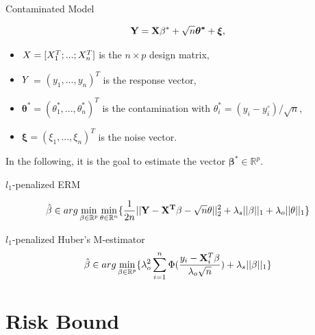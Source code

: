 \documentclass[unknownkeysallowed]{beamer}
\begin{document}
\begin{frame}{Contaminated Model}
	
	\begin{equation*}
	\bold{Y} = \bold{X\beta^*} + \sqrt{n} \boldsymbol{\theta^*} + \boldsymbol{\xi},
	\end{equation*}
	
	\begin{itemize}
		\item $\boldmath{X} = [\boldmath{X}_1^T;...;\boldmath{X}^T_n]$ is the $n\times p$ design matrix,
		\item $\boldmath{Y}$ = $(y_1,...,y_n)^T$ is the response vector,
		\item $ \boldsymbol{\theta^*} = (\theta^*_1,...,\theta^*_n)^T$ is the contamination with $\theta^*_i = (y_i - y_i^{\circ})/\sqrt{n}$,
		\item $\boldsymbol{\xi} = (\xi_1,...,\xi_n)^T$ is the noise vector.
	\end{itemize}
	In the following, it is the goal to estimate the vector $\boldsymbol{\beta}^* \in \mathbb{R}^p$.
\end{frame}



\begin{frame}{$l_1$-penalized ERM}
	
	\begin{equation*}
	\hat{\bold{\beta}} \in arg
	\min\limits_{\bold{\beta}\in
		\mathbb{R}^p} \min\limits_{\bold{\theta}\in
		\mathbb{R}^n}\{\frac{1}{2n} ||\bold{Y} - \bold{X^T\beta} - \sqrt{n}\bold{\theta}||_2^2 + \lambda_s ||\bold{\beta}||_1 + \lambda_o||\bold{\theta}||_1\}
	\end{equation*}
	
\end{frame}


\begin{frame}{$l_1$-penalized Huber's M-estimator}
	\begin{equation*}
	\hat{\beta} \in arg \min\limits_{\bold{\beta}\in
		\mathbb{R}^p} \{ \lambda_o^2 \sum_{i = 1}^{n}\Phi (\frac{y_i - \bold{X}^T_i \bold{\beta}}{\lambda_o \sqrt{n}}) + \lambda_s||\bold{\beta}||_1\}
	\end{equation*}
\end{frame}



\section{Risk Bound}
\end{document}
